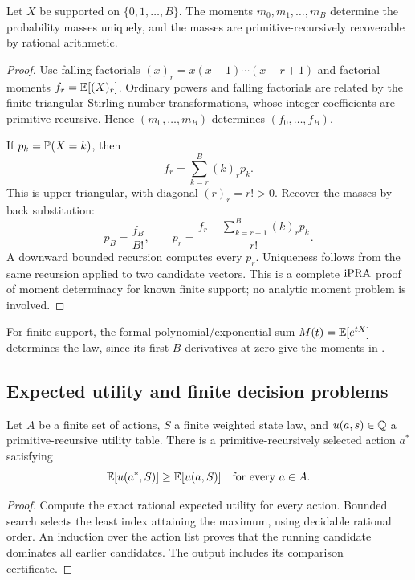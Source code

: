 \begin{theorem}\label{thm:moment-determinacy}
Let \(X\) be supported on \(\{0,1,\ldots,B\}\).  The moments
\(m_0,m_1,\ldots,m_B\) determine the probability masses uniquely, and the
masses are primitive-recursively recoverable by rational arithmetic.
\end{theorem}

\begin{proof}
Use falling factorials
\((x)_r=x(x-1)\cdots(x-r+1)\) and factorial moments
\(f_r=\mathbb E[(X)_r]\).  Ordinary powers and falling factorials are related by the
finite triangular Stirling-number transformations, whose integer coefficients
are primitive recursive.  Hence \((m_0,\ldots,m_B)\) determines
\((f_0,\ldots,f_B)\).

If \(p_k=\mathbb P(X=k)\), then
\[
 f_r=\sum_{k=r}^{B}(k)_r p_k.
\]
This is upper triangular, with diagonal \((r)_r=r!>0\).  Recover the masses by
back substitution:
\[
 p_B=\frac{f_B}{B!},\qquad
 p_r=\frac{f_r-\sum_{k=r+1}^{B}(k)_r p_k}{r!}.
\]
A downward bounded recursion computes every \(p_r\).  Uniqueness follows from
the same recursion applied to two candidate vectors.  This is a complete
\(\mathrm{iPRA}\) proof of moment determinacy for known finite support; no analytic
moment problem is involved.
\end{proof}

\begin{corollary}
For finite support, the formal polynomial/exponential sum
\(M(t)=\mathbb E[e^{tX}]\) determines the law, since its first \(B\) derivatives at
zero give the moments in .
\end{corollary}

\subsection{Expected utility and finite decision problems}

\begin{theorem}\label{thm:expected-utility}
Let \(A\) be a finite set of actions, \(S\) a finite weighted state law, and
\(u(a,s)\in\mathbb Q\) a primitive-recursive utility table.  There is a
primitive-recursively selected action \(a^*\) satisfying
\[
 \mathbb E[u(a^*,S)]\ge\mathbb E[u(a,S)]\quad\text{for every }a\in A.
\]
\end{theorem}

\begin{proof}
Compute the exact rational expected utility for every action.  Bounded search
selects the least index attaining the maximum, using decidable rational order.
An induction over the action list proves that the running candidate dominates
all earlier candidates.  The output includes its comparison certificate.
\end{proof}

